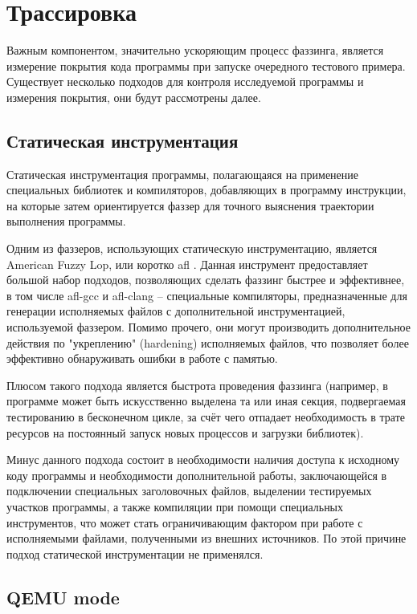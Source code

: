 \section{Трассировка}\label{sec:trace}

Важным компонентом, значительно ускоряющим процесс фаззинга, является измерение покрытия кода программы при запуске очередного тестового примера. Существует несколько подходов для контроля исследуемой программы и измерения покрытия, они будут рассмотрены далее.


\subsection{Статическая инструментация}

Статическая инструментация программы, полагающаяся на применение специальных библиотек и компиляторов, добавляющих в программу инструкции, на которые затем ориентируется фаззер для точного выяснения траектории выполнения программы.

Одним из фаззеров, использующих статическую инструментацию, является American Fuzzy Lop, или коротко afl \cite{afl}. Данная инструмент предоставляет большой набор подходов, позволяющих сделать фаззинг быстрее и эффективнее, в том числе afl-gcc и afl-clang -- специальные компиляторы, предназначенные для генерации исполняемых файлов с дополнительной инструментацией, используемой фаззером. Помимо прочего, они могут производить дополнительное действия по "укреплению" (hardening) исполняемых файлов, что позволяет более эффективно обнаруживать ошибки в работе с памятью.

Плюсом такого подхода является быстрота проведения фаззинга (например, в программе может быть искусственно выделена та или иная секция, подвергаемая тестированию в бесконечном цикле, за счёт чего отпадает необходимость в трате ресурсов на постоянный запуск новых процессов и загрузки библиотек).

Минус данного подхода состоит в необходимости наличия доступа к исходному коду программы и необходимости дополнительной работы, заключающейся в подключении специальных заголовочных файлов, выделении тестируемых участков программы, а также компиляции при помощи специальных инструментов, что может стать ограничивающим фактором при работе с исполняемыми файлами, полученными из внешних источников. По этой причине подход статической инструментации не применялся.

\subsection{QEMU mode}


